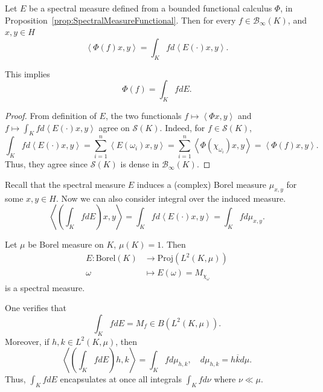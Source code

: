 \begin{proposition}
	\label{prop:SpectralAndCalculus}
	Let $E$ be a spectral measure defined from a bounded functional calculus $\Phi$, in Proposition~\ref{prop:SpectralMeasureFunctional}. Then for every $f \in \mathcal{B}_{\infty }(K)$, and $x, y \in H$
	\[
		\left\langle \Phi(f) x, y \right\rangle 
		= \int _K f d\left\langle E(\cdot ) x, y \right\rangle 
	.\] 

	This implies
	\[
		\Phi(f) = \int _K f d E
	.\] 
\end{proposition}
\begin{proof}
	From definition of $E$, the two functionals $f\mapsto \left\langle \Phi x, y\right\rangle $ and $f\mapsto \int _K f d\left\langle E(\cdot )x, y \right\rangle $ agree on $\mathcal{S}(K)$. Indeed, for $ f\in \mathcal{S}(K)$, 
	\[
		\int _K f d\left\langle E(\cdot )x, y \right\rangle 
	= \sum_{i = 1}^n \left\langle E(\omega_i)x, y \right\rangle 
= \sum_{i = 1}^n \left\langle \Phi(\chi_{\omega_i})x, y \right\rangle 
= \left\langle \Phi(f) x, y \right\rangle 
.\]
Thus, they agree since $\mathcal{S}(K)$ is dense in  $\mathcal{B}_\infty \left(K \right) $.
\end{proof}

\begin{remark}
	Recall that the spectral measure $E$ induces a (complex) Borel measure $\mu_{x, y}$ for some $x, y \in H$. Now we can also consider integral over the induced measure.
	 \[
		\left\langle \left( \int_K f d E \right) x, y \right\rangle = \int _K f d \left\langle E(\cdot )x, y \right\rangle 
		= \int _K f d \mu_{x, y}
	.\] 
\end{remark}

\begin{example}
	Let $\mu$ be Borel measure on $K$, $\mu(K) = 1$. Then
	\begin{align*}
		E: \text{Borel}(K) &\longrightarrow \text{Proj}(L^2(K, \mu)) \\
		\omega &\longmapsto E(\omega) = M_{\chi_\omega}
	\end{align*}
	is a spectral measure.

	One verifies that
	\[
		\int _K f d E = M_f \in B(L^2(K, \mu))
	.\] 
	Moreover, if $h, k \in L^2(K, \mu)$, then
	\[
		\left\langle \left(\int _K f dE\right)h, k \right\rangle = \int _K f d\mu_{h, k}, \quad d \mu_{h, k} = h \overline{k} d \mu
	.\] 
	Thus, $\int _K f d E$ encapsulates at once all integrals $\int _K f d \nu$ where $\nu \ll \mu$.

\end{example}

